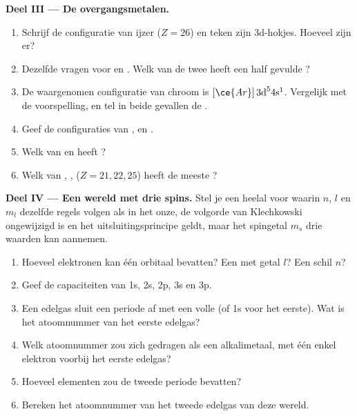 \begin{problem}
\medskip
\noindent\textbf{Deel III --- De overgangsmetalen.}
\begin{enumerate}[resume]
  \item Schrijf de configuratie van ijzer ($Z = 26$) en teken zijn
        3d-hokjes. Hoeveel  zijn er?
  \item Dezelfde vragen voor  en . Welk van de twee
        heeft een half gevulde ?
  \item De waargenomen configuratie van chroom is $[\ce{Ar}]\,3\text{d}^5
        4\text{s}^1$. Vergelijk met de voorspelling, en tel in beide
        gevallen de .
  \item Geef de configuraties van ,  en .
  \item Welk van  en  heeft ?
  \item Welk van , ,  ($Z = 21, 22, 25$)
        heeft de meeste ?
\end{enumerate}

\medskip
\noindent\textbf{Deel IV --- Een wereld met drie spins.}
Stel je een heelal voor waarin $n$, $l$ en $m_l$ dezelfde regels volgen
als in het onze, de volgorde van Klechkowski ongewijzigd is en het
uitsluitingsprincipe geldt, maar het spingetal $m_s$ drie waarden kan
aannemen.
\begin{enumerate}[resume]
  \item Hoeveel elektronen kan één orbitaal bevatten? Een  met
        getal $l$? Een schil $n$?
  \item Geef de capaciteiten van 1s, 2s, 2p, 3s en 3p.
  \item Een edelgas sluit een periode af met een volle  (of 1s
        voor het eerste). Wat is het atoomnummer van het eerste edelgas?
  \item Welk atoomnummer zou zich gedragen als een alkalimetaal, met één
        enkel elektron voorbij het eerste edelgas?
  \item Hoeveel elementen zou de tweede periode bevatten?
  \item Bereken het atoomnummer van het tweede edelgas van deze wereld.
\end{enumerate}
\end{problem}
